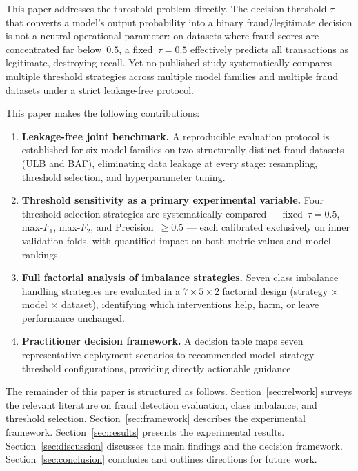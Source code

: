 \documentclass[a4paper,fleqn]{cas-sc}
\begin{document}
This paper addresses the threshold problem directly.
The decision threshold $\tau$ that converts a model's output probability into a binary
fraud/legitimate decision is not a neutral operational parameter: on datasets where
fraud scores are concentrated far below~$0.5$, a fixed~$\tau=0.5$ effectively predicts
all transactions as legitimate, destroying recall.
Yet no published study systematically compares multiple threshold strategies across
multiple model families and multiple fraud datasets under a strict leakage-free protocol.

This paper makes the following contributions:
\begin{enumerate}[label=\textbf{C\arabic*.}]
  \item \textbf{Leakage-free joint benchmark.}
    A reproducible evaluation protocol is established for six model families on two
    structurally distinct fraud datasets (ULB and BAF), eliminating data leakage at
    every stage: resampling, threshold selection, and hyperparameter tuning.
  \item \textbf{Threshold sensitivity as a primary experimental variable.}
    Four threshold selection strategies are systematically compared --- fixed~$\tau=0.5$,
    max-$F_1$, max-$F_2$, and Precision~$\geq 0.5$ --- each calibrated exclusively on
    inner validation folds, with quantified impact on both metric values and model rankings.
  \item \textbf{Full factorial analysis of imbalance strategies.}
    Seven class imbalance handling strategies are evaluated in a $7{\times}5{\times}2$
    factorial design (strategy $\times$ model $\times$ dataset), identifying which
    interventions help, harm, or leave performance unchanged.
  \item \textbf{Practitioner decision framework.}
    A decision table maps seven representative deployment scenarios to recommended
    model--strategy--threshold configurations, providing directly actionable guidance.
\end{enumerate}

The remainder of this paper is structured as follows.
Section~\ref{sec:relwork} surveys the relevant literature on fraud detection evaluation,
class imbalance, and threshold selection.
Section~\ref{sec:framework} describes the experimental framework.
Section~\ref{sec:results} presents the experimental results.
Section~\ref{sec:discussion} discusses the main findings and the decision framework.
Section~\ref{sec:conclusion} concludes and outlines directions for future work.
\end{document}
